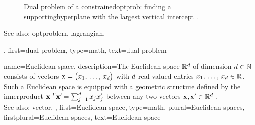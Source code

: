 {{\begin{figure}[H]
     		\caption{Dual problem of a \gls{constrainedoptprob}: finding a \gls{supportinghyperplane} with 
     		  	the largest vertical intercept \cite [Sec. 5.3]{BoydConvexBook}.	\label{fig_dual_problem_dict}}
		\end{figure}
		See also: \gls{optproblem}, \gls{lagrangian}. },
	first={dual problem},
	type=math,
	text={dual problem}
}

{name={Euclidean space}, 
	description={The 
		Euclidean space $\mathbb{R}^{d}$ of dimension $d \in \mathbb{N}$ consists 
		of \glspl{vector} ${\bf x}= \big(x_{1}, \,\ldots, \,x_{d}\big)$ with $d$ 
		real-valued entries $x_{1}, \,\ldots, \,x_{d} \in \mathbb{R}$. Such a Euclidean 
		space is equipped with a geometric structure defined by the \gls{innerproduct} 
		${\bf x}\,^{T} {\bf x}' = \sum_{j=1}^{d} x_{j} x'_{j}$ 
		between any two \glspl{vector} ${\bf x},{\bf x}' \in \mathbb{R}^{d}$ \cite{RudinBookPrinciplesMatheAnalysis}.
		\\
		See also: \gls{vector}. },
	first={Euclidean space},
	type=math, 
	plural={Euclidean spaces}, 
	firstplural={Euclidean spaces},
	text={Euclidean space} 
}

